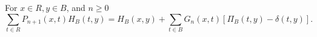 For $x \in R, y \in B$, and $n \geq 0$
$$\sum_{t \in R} P_{n+1}(x,t)H_B(t,y) = H_B(x,y) + \sum_{t \in B} G_n(x,t)[\Pi_B(t,y) - \delta(t,y)].$$